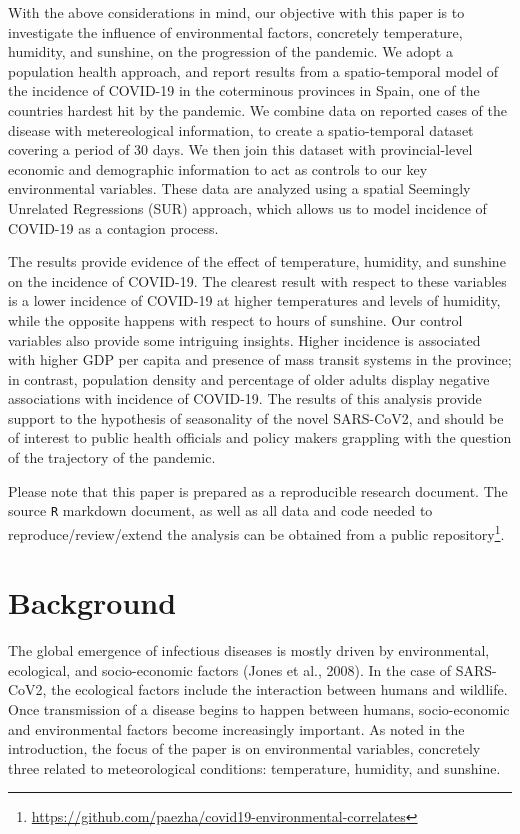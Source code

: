 \documentclass[]{elsarticle} %
\begin{document}
With the above considerations in mind, our objective with this paper is
to investigate the influence of environmental factors, concretely
temperature, humidity, and sunshine, on the progression of the pandemic.
We adopt a population health approach, and report results from a
spatio-temporal model of the incidence of COVID-19 in the coterminous
provinces in Spain, one of the countries hardest hit by the pandemic. We
combine data on reported cases of the disease with metereological
information, to create a spatio-temporal dataset covering a period of 30
days. We then join this dataset with provincial-level economic and
demographic information to act as controls to our key environmental
variables. These data are analyzed using a spatial Seemingly Unrelated
Regressions (SUR) approach, which allows us to model incidence of
COVID-19 as a contagion process.

The results provide evidence of the effect of temperature, humidity, and
sunshine on the incidence of COVID-19. The clearest result with respect
to these variables is a lower incidence of COVID-19 at higher
temperatures and levels of humidity, while the opposite happens with
respect to hours of sunshine. Our control variables also provide some
intriguing insights. Higher incidence is associated with higher GDP per
capita and presence of mass transit systems in the province; in
contrast, population density and percentage of older adults display
negative associations with incidence of COVID-19. The results of this
analysis provide support to the hypothesis of seasonality of the novel
SARS-CoV2, and should be of interest to public health officials and
policy makers grappling with the question of the trajectory of the
pandemic.

Please note that this paper is prepared as a reproducible research
document. The source \texttt{R} markdown document, as well as all data
and code needed to reproduce/review/extend the analysis can be obtained
from a public
repository\footnote{\url{https://github.com/paezha/covid19-environmental-correlates}}.

\hypertarget{background}{%
\section{Background}\label{background}}

The global emergence of infectious diseases is mostly driven by
environmental, ecological, and socio-economic factors (Jones et al.,
2008). In the case of SARS-CoV2, the ecological factors include the
interaction between humans and wildlife. Once transmission of a disease
begins to happen between humans, socio-economic and environmental
factors become increasingly important. As noted in the introduction, the
focus of the paper is on environmental variables, concretely three
related to meteorological conditions: temperature, humidity, and
sunshine.
\end{document}
